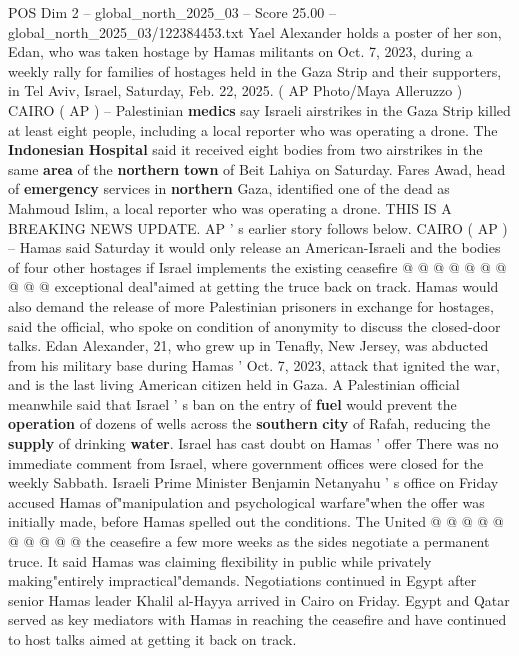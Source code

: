 \begin{textsample}{POS Dim 2 – global\_north\_2025\_03 – Score 25.00 – global\_north\_2025\_03/122384453.txt}  \label{ex:f2_pos_407}
Yael Alexander holds a poster of her son, Edan, who was taken hostage by Hamas militants on Oct. 7, 2023, during a weekly rally for families of hostages held in the Gaza Strip and their supporters, in Tel Aviv, Israel, Saturday, Feb. 22, 2025. ( AP Photo/Maya Alleruzzo ) CAIRO ( AP ) -- Palestinian \textbf{medics} say Israeli airstrikes in the Gaza Strip killed at least eight people, including a local reporter who was operating a drone.
The \textbf{Indonesian} \textbf{Hospital} said it received eight bodies from two airstrikes in the same \textbf{area} of the \textbf{northern} \textbf{town} of Beit Lahiya on Saturday.
Fares Awad, head of \textbf{emergency} services in \textbf{northern} Gaza, identified one of the dead as Mahmoud Islim, a local reporter who was operating a drone.
THIS IS A BREAKING NEWS UPDATE.
AP ' s earlier story follows below.
CAIRO ( AP ) -- Hamas said Saturday it would only release an American-Israeli and the bodies of four other hostages if Israel implements the existing ceasefire @ @ @ @ @ @ @ @ @ @ exceptional deal"aimed at getting the truce back on track.
Hamas would also demand the release of more Palestinian prisoners in exchange for hostages, said the official, who spoke on condition of anonymity to discuss the closed-door talks.
Edan Alexander, 21, who grew up in Tenafly, New Jersey, was abducted from his military base during Hamas ' Oct. 7, 2023, attack that ignited the war, and is the last living American citizen held in Gaza.
A Palestinian official meanwhile said that Israel ' s ban on the entry of \textbf{fuel} would prevent the \textbf{operation} of dozens of wells across the \textbf{southern} \textbf{city} of Rafah, reducing the \textbf{supply} of drinking \textbf{water}.
Israel has cast doubt on Hamas ' offer There was no immediate comment from Israel, where government offices were closed for the weekly Sabbath.
Israeli Prime Minister Benjamin Netanyahu ' s office on Friday accused Hamas of"manipulation and psychological warfare"when the offer was initially made, before Hamas spelled out the conditions.
The United @ @ @ @ @ @ @ @ @ @ the ceasefire a few more weeks as the sides negotiate a permanent truce.
It said Hamas was claiming flexibility in public while privately making"entirely impractical"demands.
Negotiations continued in Egypt after senior Hamas leader Khalil al-Hayya arrived in Cairo on Friday.
Egypt and Qatar served as key mediators with Hamas in reaching the ceasefire and have continued to host talks aimed at getting it back on track.

\end{textsample}
